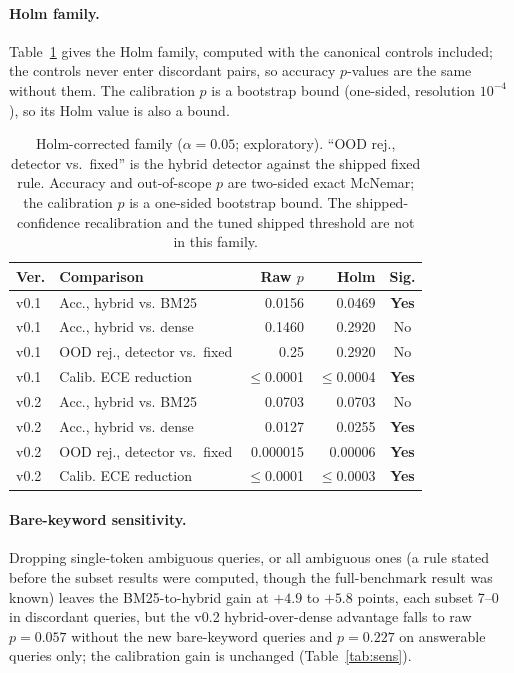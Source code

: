 \paragraph{Holm family.} Table~\ref{tab:holm} gives the Holm family, computed with the canonical controls
included; the controls never enter discordant pairs, so accuracy $p$-values are the same without them. The
calibration $p$ is a bootstrap bound (one-sided, resolution $10^{-4}$), so its Holm value is also a bound.

\begin{table}[t]
  \centering
  \small
  \setlength{\tabcolsep}{3pt}
  \begin{tabular}{@{}llrrc@{}}
    \toprule
    \textbf{Ver.} & \textbf{Comparison} & \textbf{Raw $p$} & \textbf{Holm} & \textbf{Sig.} \\
    \midrule
    v0.1 & Acc., hybrid vs. BM25 & 0.0156 & 0.0469 & \textbf{Yes} \\
    v0.1 & Acc., hybrid vs. dense & 0.1460 & 0.2920 & No \\
    v0.1 & OOD rej., detector vs.\ fixed & 0.25 & 0.2920 & No \\
    v0.1 & Calib. ECE reduction & $\leq$0.0001 & $\leq$0.0004 & \textbf{Yes} \\
    v0.2 & Acc., hybrid vs. BM25 & 0.0703 & 0.0703 & No \\
    v0.2 & Acc., hybrid vs. dense & 0.0127 & 0.0255 & \textbf{Yes} \\
    v0.2 & OOD rej., detector vs.\ fixed & 0.000015 & 0.00006 & \textbf{Yes} \\
    v0.2 & Calib. ECE reduction & $\leq$0.0001 & $\leq$0.0003 & \textbf{Yes} \\
    \bottomrule
  \end{tabular}
  \caption{Holm-corrected family ($\alpha=0.05$; exploratory). ``OOD rej., detector vs.\ fixed'' is the hybrid detector
  against the shipped fixed rule. Accuracy and out-of-scope $p$ are two-sided exact McNemar; the calibration $p$ is a
  one-sided bootstrap bound. The shipped-confidence recalibration and the tuned shipped threshold are not in this
  family.}
  \label{tab:holm}
\end{table}

\paragraph{Bare-keyword sensitivity.} Dropping single-token ambiguous queries, or all ambiguous ones (a rule stated before the subset results
were computed, though the full-benchmark result was known) leaves the BM25-to-hybrid gain at $+4.9$ to $+5.8$ points,
each subset 7--0 in discordant queries, but the v0.2 hybrid-over-dense advantage falls to raw $p=0.057$ without the new
bare-keyword queries and $p=0.227$ on answerable queries only; the calibration gain is unchanged (Table~\ref{tab:sens}).


